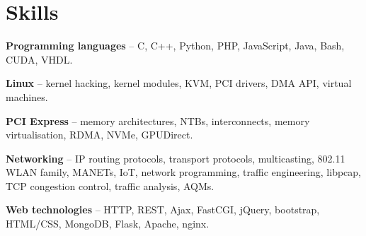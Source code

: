 \section{Skills}
\begin{small}
	\parbox[t][][t]{\linewidth}{
		\textbf{Programming languages} -- C, C++, Python, PHP, JavaScript, Java, Bash, CUDA, VHDL.
		\smallbreak
	}
	\parbox[t][][t]{\linewidth}{
		\textbf{Linux} -- kernel hacking, kernel modules,
		KVM, PCI drivers, DMA API, virtual machines.
		\smallbreak
	}
	\parbox[t][][t]{\linewidth}{
		\textbf{PCI Express} -- memory architectures, NTBs, 
		interconnects, memory virtualisation, RDMA, NVMe, GPUDirect.
		\smallbreak
	}
	\parbox[t][][t]{\linewidth}{
		\textbf{Networking} -- IP routing protocols, transport protocols,
		multicasting, 802.11 WLAN family, MANETs, IoT, network programming, 
		traffic engineering, libpcap, TCP congestion control, traffic
		analysis, AQMs.
		\smallbreak
	}
	\parbox[t][][t]{\linewidth}{
		\textbf{Web technologies} -- HTTP, REST, Ajax, FastCGI, jQuery,
		bootstrap, HTML/CSS, MongoDB, Flask, Apache, nginx.
		\smallbreak
	}
\end{small}

